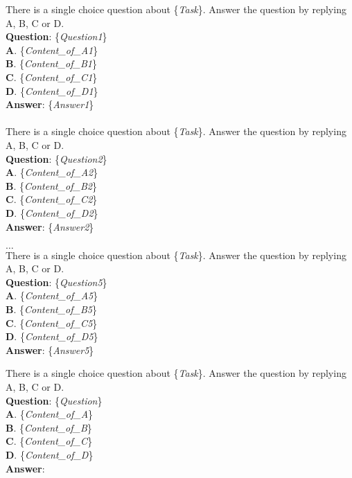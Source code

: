 \begin{table}[]
\centering

\begin{tcolorbox}[title={In-Context Examples}, colback=white, coltitle=black, colbacktitle=white!0]
There is a single choice question about \{\textit{Task}\}. Answer the question by replying A, B, C or D.\\
\textbf{Question}: \{\textit{Question1}\} \\
\textbf{A}. \{\textit{Content\_of\_A1}\}\\
\textbf{B}. \{\textit{Content\_of\_B1}\}\\
\textbf{C}. \{\textit{Content\_of\_C1}\}\\
\textbf{D}. \{\textit{Content\_of\_D1}\}\\
\textbf{Answer}: \{\textit{Answer1}\}\\
\\
There is a single choice question about \{\textit{Task}\}. Answer the question by replying A, B, C or D.\\
\textbf{Question}: \{\textit{Question2}\} \\
\textbf{A}. \{\textit{Content\_of\_A2}\}\\
\textbf{B}. \{\textit{Content\_of\_B2}\}\\
\textbf{C}. \{\textit{Content\_of\_C2}\}\\
\textbf{D}. \{\textit{Content\_of\_D2}\}\\
\textbf{Answer}: \{\textit{Answer2}\}\\
\\
$\dots$
\\
There is a single choice question about \{\textit{Task}\}. Answer the question by replying A, B, C or D.\\
\textbf{Question}: \{\textit{Question5}\} \\
\textbf{A}. \{\textit{Content\_of\_A5}\}\\
\textbf{B}. \{\textit{Content\_of\_B5}\}\\
\textbf{C}. \{\textit{Content\_of\_C5}\}\\
\textbf{D}. \{\textit{Content\_of\_D5}\}\\
\textbf{Answer}: \{\textit{Answer5}\}\\
\end{tcolorbox}

\begin{tcolorbox}[title={Instruction}, colback=white, coltitle=black, colbacktitle=white!0]
There is a single choice question about \{\textit{Task}\}. Answer the question by replying A, B, C or D.\\
\textbf{Question}: \{\textit{Question}\} \\
\textbf{A}. \{\textit{Content\_of\_A}\}\\
\textbf{B}. \{\textit{Content\_of\_B}\}\\
\textbf{C}. \{\textit{Content\_of\_C}\}\\
\textbf{D}. \{\textit{Content\_of\_D}\}\\
\textbf{Answer}:
\end{tcolorbox}

\caption{The Prompt Template for Knowledge State Query on MMLU. The Italic \{\textit{text}\} in Curly Braces Represents Variables That Need To be Replaced.}
\label{table:prompt_kq_MMLU}

\end{table}
